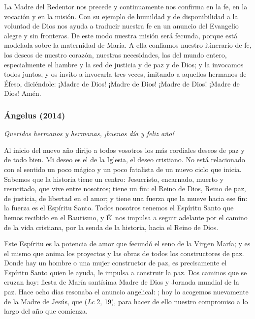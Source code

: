 \begin{body}
\begin{body}
{La Madre del Redentor nos precede y continuamente nos confirma en la fe, en la vocación y en la misión. Con su ejemplo de humildad y de disponibilidad a la voluntad de Dios nos ayuda a traducir nuestra fe en un anuncio del Evangelio alegre y sin fronteras. De este modo nuestra misión será fecunda, porque está modelada sobre la maternidad de María. A ella confiamos nuestro itinerario de fe, los deseos de nuestro corazón, nuestras necesidades, las del mundo entero, especialmente el hambre y la sed de justicia y de paz y de Dios; y la invocamos todos juntos, y os invito a invocarla tres veces, imitando a aquellos hermanos de Éfeso, diciéndole: ¡Madre de Dios! ¡Madre de Dios! ¡Madre de Dios! ¡Madre de Dios! Amén.

\subsubsection{Ángelus (2014)} \emph{Queridos hermanos y hermanas, ¡buenos día y feliz año!}

Al inicio del nuevo año dirijo a todos vosotros los más cordiales deseos de paz y de todo bien. Mi deseo es el de la Iglesia, el deseo cristiano. No está relacionado con el sentido un poco mágico y un poco fatalista de un nuevo ciclo que inicia. Sabemos que la historia tiene un centro: Jesucristo, encarnado, muerto y resucitado, que vive entre nosotros; tiene un fin: el Reino de Dios, Reino de paz, de justicia, de libertad en el amor; y tiene una fuerza que la mueve hacia ese fin: la fuerza es el Espíritu Santo. Todos nosotros tenemos el Espíritu Santo que hemos recibido en el Bautismo, y Él nos impulsa a seguir adelante por el camino de la vida cristiana, por la senda de la historia, hacia el Reino de Dios.

Este Espíritu es la potencia de amor que fecundó el seno de la Virgen María; y es el mismo que anima los proyectos y las obras de todos los constructores de paz. Donde hay un hombre o una mujer constructor de paz, es precisamente el Espíritu Santo quien le ayuda, le impulsa a construir la paz. Dos caminos que se cruzan hoy: fiesta de María santísima Madre de Dios y Jornada mundial de la paz. Hace ocho días resonaba el anuncio angelical: ; hoy lo acogemos nuevamente de la Madre de Jesús, que  (\emph{Lc} 2, 19), para hacer de ello nuestro compromiso a lo largo del año que comienza.

}
\end{body}
\end{body}
